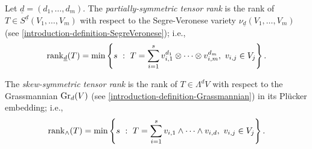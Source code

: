  \begin{definition}
 \label{geometrySecants-definition-partially_symmetric_tensor_rank}
     Let $\underline{d} = (d_1,\ldots,d_m)$. The \emph{partially-symmetric tensor rank} is the rank of $T \in S^{\underline{d}}(V_1,\ldots,V_m)$ with respect to the Segre-Veronese variety $\nu_{\underline{d}}(V_1,\ldots,V_m)$ (see \ref{introduction-definition-SegreVeronese}); i.e., 
     \[
         \mathrm{rank}_{\underline{d}}(T) = \min\left\{s ~:~ T = \sum_{i=1}^s v_{i,1}^{d_1}\otimes \cdots \otimes v_{i,m}^{d_m}, ~ v_{i,j} \in V_j\right\}.
     \]
 \end{definition}
 
 \begin{definition}
 \label{geometrySecants-definition-skewsymmetric_tensor_rank}
     The \emph{skew-symmetric tensor rank} is the rank of $T \in \Lambda^dV$ with respect to the Grassmannian $\mathrm{Gr}_d(V)$ (see \ref{introduction-definition-Grassmannian}) in its Pl\"ucker embedding; i.e., 
     \[
         \mathrm{rank}_{\wedge}(T) = \min\left\{s ~:~ T = \sum_{i=1}^s v_{i,1}\wedge \dots \wedge v_{i,d}, ~ v_{i,j} \in V_j\right\}.
     \]
 \end{definition}
 
 
 